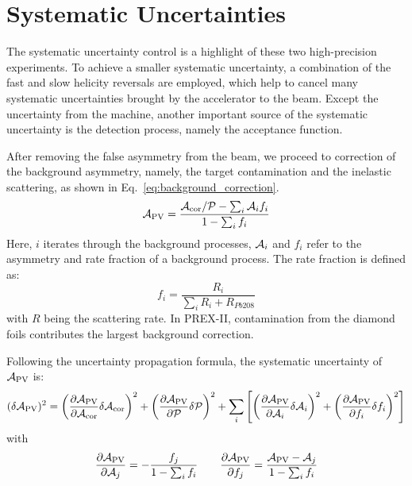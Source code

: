 \chapter{Systematic Uncertainties}
\label{cha:systematic_uncertainties}

The systematic uncertainty control is a highlight of these two
high-precision experiments. To achieve a smaller systematic uncertainty, a
combination of the fast and slow helicity reversals are employed, which help
to cancel many systematic uncertainties brought by the accelerator to the
beam. Except the uncertainty from the machine, another important source
of the systematic uncertainty is the detection process, namely the 
acceptance function.

After removing the false asymmetry from the beam, we proceed to correction of the
background asymmetry, namely, the target contamination and the inelastic scattering,
as shown in Eq.~\ref{eq:background_correction}.
\begin{equation}
    \mathcal{A}_{\text{PV}} = \frac{\mathcal{A}_{\text{cor}}/\mathcal{P} - \sum_i \mathcal{A}_i f_i}{1 - \sum_i f_i}
    \label{eq:background_correction}
\end{equation}
Here, $i$ iterates through the background processes, $\mathcal{A}_i$ and $f_i$ refer to 
the asymmetry and rate fraction of a background process. The rate fraction is defined
as:
\begin{equation}
    f_i = \frac{R_i}{\sum_i R_i + R_{Pb208}}
\end{equation}
with $R$ being the scattering rate.
In PREX-II, contamination from the diamond foils contributes the largest 
background correction.

Following the uncertainty propagation formula, the systematic uncertainty of
$\mathcal{A}_{\text{PV}}$ is:
\begin{equation}
    (\delta \mathcal{A}_{\text{PV}})^2 = 
      \left( \frac{\partial \mathcal{A}_{\text{PV}}}{\partial \mathcal{A}_{\text{cor}}} \delta \mathcal{A}_{\text{cor}} \right)^2
      + \left( \frac{\partial \mathcal{A}_{\text{PV}}}{\partial \mathcal{P}} \delta \mathcal{P} \right)^2
      + \sum_i \left[ \left(\frac{\partial \mathcal{A}_{\text{PV}}}{\partial \mathcal{A}_i}\delta \mathcal{A}_i \right)^2 
	 + \left(\frac{\partial \mathcal{A}_{\text{PV}}}{\partial f_i}\delta f_i \right)^2 \right]
\end{equation}
with
\begin{equation}
    \frac{\partial \mathcal{A}_{\text{PV}}}{\partial \mathcal{A}_j} = -\frac{f_j}{1 - \sum_i f_i}  \qquad
    \frac{\partial \mathcal{A}_{\text{PV}}}{\partial f_j} = \frac{\mathcal{A}_{\text{PV}} - \mathcal{A}_j}{1 - \sum_i f_i}
    \label{eq:systematic_uncertainty}
\end{equation}

